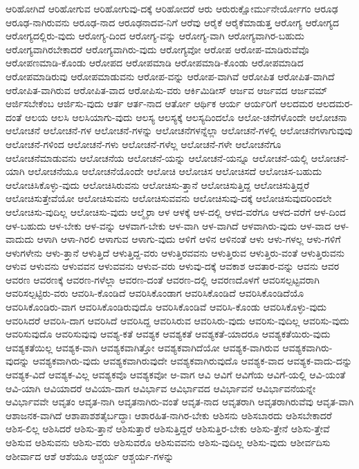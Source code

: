 {ಆರಿಹೋಗಿದೆ
ಆರಿಹೋಗುವ
ಆರಿಹೋಗುವು-ದಕ್ಕೆ
ಆರಿಹೋದರೆ
ಆರು
ಆರುರುಕ್ಷೋರ್ಮುನೇರ್ಯೋಗಂ
ಆರೂಢ
ಆರೂಢ-ನಾಗಿರುವನು
ಆರೂಢ-ನಾದ
ಆರೂಢನಾದವ-ನಿಗೆ
ಆರೆವು
ಆರೈಕೆ
ಆರೈಕೆಮಾಡುತ್ತ
ಆರೋಗ್ಯ
ಆರೋಗ್ಯದ
ಆರೋಗ್ಯದಲ್ಲಿರು-ವುದು
ಆರೋಗ್ಯ-ದಿಂದ
ಆರೋಗ್ಯ-ವನ್ನು
ಆರೋಗ್ಯ-ವಾಗಿ
ಆರೋಗ್ಯವಾಗಿರ-ಬಹುದು
ಆರೋಗ್ಯವಾಗಿರಬೇಕಾದರೆ
ಆರೋಗ್ಯವಾಗಿರು-ವುದು
ಆರೋಗ್ಯವೋ
ಆರೋಪ
ಆರೋಪ-ಮಾಡಿರುವೆವೊ
ಆರೋಪಣಮಾಡಿ-ಕೊಂಡು
ಆರೋಪದ
ಆರೋಪಮಾಡಿ
ಆರೋಪಮಾಡಿ-ಕೊಂಡು
ಆರೋಪಮಾಡಿದ
ಆರೋಪಮಾಡಿರುವು
ಆರೋಪಮಾಡುವನು
ಆರೋಪ-ವನ್ನು
ಆರೋಪ-ವಾಗಿವೆ
ಆರೋಪಿತ
ಆರೋಪಿತ-ವಾಗಿದೆ
ಆರೋಪಿತ-ವಾಗಿರುವ
ಆರೋಪಿತ-ವಾದ
ಆರೋಪಿಸು-ವರು
ಆರ್ಕಿಮಿಡೀಸ್
ಆರ್ಜವ
ಆರ್ಜವದ
ಆರ್ಜವಮ್
ಆರ್ಜಿಸಬೇಕೆಂಬ
ಆರ್ಜಿಸು-ವುದು
ಆರ್ತ
ಆರ್ತ-ನಾದ
ಆರ್ತೋ
ಆರ್ಥಿಕ
ಆರ್ಯ
ಆರ್ಯರಿಗೆ
ಆಲದಮರ
ಆಲದಮರ-ದಂತೆ
ಆಲಯ
ಆಲಸಿ
ಆಲಸಿಯಾಗು-ವುದು
ಆಲಸ್ಯ
ಆಲಸ್ಯಕ್ಕೆ
ಆಲಸ್ಯದಿಂದಲೊ
ಆಲೋ-ಚನೆಗಳೊಂದೇ
ಆಲೋಚನಾ
ಆಲೋಚನೆ
ಆಲೋಚನೆ-ಗಳ
ಆಲೋಚನೆ-ಗಳನ್ನು
ಆಲೋಚನೆಗಳನ್ನೆಲ್ಲಾ
ಆಲೋಚನೆ-ಗಳಲ್ಲಿ
ಆಲೋಚನೆಗಳಾಗುವುವು
ಆಲೋಚನೆ-ಗಳಿಂದ
ಆಲೋಚನೆ-ಗಳು
ಆಲೋಚನೆ-ಗಳೆಲ್ಲ
ಆಲೋಚನೆ-ಗಳೇ
ಆಲೋಚನೆಗೂ
ಆಲೋಚನೆಮಾಡುವನು
ಆಲೋಚನೆಯ
ಆಲೋಚನೆ-ಯನ್ನು
ಆಲೋಚನೆ-ಯನ್ನೂ
ಆಲೋಚನೆ-ಯಲ್ಲಿ
ಆಲೋಚನೆ-ಯಾಗಿ
ಆಲೋಚನೆಯೂ
ಆಲೋಚನೆಯೊಂದೇ
ಆಲೋಚಿ
ಆಲೋಚಿಸ
ಆಲೋಚಿಸದೆ
ಆಲೋಚಿಸ-ಬಹುದು
ಆಲೋಚಿಸಿಕೊಳ್ಳು-ವುದು
ಆಲೋಚಿಸಿರುವನು
ಆಲೋಚಿಸು-ತ್ತಾನೆ
ಆಲೋಚಿಸುತ್ತಿದ್ದ
ಆಲೋಚಿಸುತ್ತಿದ್ದರೆ
ಆಲೋಚಿಸುತ್ತೇವೆಯೋ
ಆಲೋಚಿಸುವನು
ಆಲೋಚಿಸುವವನು
ಆಲೋಚಿಸುವು-ದಕ್ಕೆ
ಆಲೋಚಿಸುವುದರಿಂದಲೇ
ಆಲೋಚಿಸು-ವುದಿಲ್ಲ
ಆಲೋಚಿಸು-ವುದು
ಆಲ್ಮೈರಾ
ಆಳ
ಆಳಕ್ಕೆ
ಆಳ-ದಲ್ಲಿ
ಆಳದ-ವರೆಗೂ
ಆಳದ-ವರೆಗೆ
ಆಳ-ದಿಂದ
ಆಳ-ಬಹುದು
ಆಳ-ಬೇಕು
ಆಳ-ವನ್ನು
ಆಳವಾಗ-ಬೇಕು
ಆಳ-ವಾಗಿ
ಆಳ-ವಾಗಿದೆ
ಆಳವಾಗಿರು-ವುದು
ಆಳ-ವಾದ
ಆಳ-ವಾದುದು
ಆಳಾಗಿ
ಆಳಾ-ಗಿರಲಿ
ಆಳಾಗುವ
ಆಳಾಗು-ವುದು
ಆಳಿಗೆ
ಆಳಿನ
ಆಳಿನಂತೆ
ಆಳು
ಆಳು-ಗಳಲ್ಲ
ಆಳು-ಗಳಿಗೆ
ಆಳುಗಳೇನು
ಆಳು-ತ್ತಾನೆ
ಆಳುತ್ತಿದೆ
ಆಳುತ್ತಿದ್ದ-ವರು
ಆಳುತ್ತಿರವವನು
ಆಳುತ್ತಿರುವ
ಆಳುತ್ತಿರು-ವಂತೆ
ಆಳುತ್ತಿರುವನು
ಆಳುವ
ಆಳುವನು
ಆಳುವವನ
ಆಳುವವನು
ಆಳುವ-ವರು
ಆಳುವು-ದಕ್ಕೆ
ಆವಕಾಶ
ಆವತಾರ-ವನ್ನು
ಆವನು
ಆವರ
ಆವರಣ
ಆವರಣಕ್ಕೆ
ಆವರಣ-ಗಳೆಲ್ಲಾ
ಆವರಣ-ದಂತೆ
ಆವರಣ-ದಲ್ಲಿ
ಆವರಣದೊಳಗೆ
ಆವರಿಸಲ್ಪಟ್ಟವರಾಗಿ
ಆವರಿಸಲ್ಪಟ್ಟಿರು-ವರು
ಆವರಿಸಿ-ಕೊಂಡಿದೆ
ಆವರಿಸಿಕೊಂಡಾಗ
ಆವರಿಸಿಕೊಂಡಿದೆ
ಆವರಿಸಿಕೊಂಡಿದೆಯೊ
ಆವರಿಸಿಕೊಂಡಿರು-ವಾಗ
ಆವರಿಸಿಕೊಂಡಿರುವುದೊ
ಆವರಿಸಿಕೊಂಡಿವೆ
ಆವರಿಸಿ-ಕೊಂಡು
ಆವರಿಸಿಕೊಳ್ಳು-ವುದು
ಆವರಿಸಿದರೆ
ಆವರಿಸಿ-ದಾಗ
ಆವರಿಸಿದೆ
ಆವರಿಸಿದ್ದ
ಆವರಿಸಿರುವ
ಆವರಿಸಿರು-ವುದು
ಆವರಿಸು-ವುದಿಲ್ಲ
ಆವರಿಸು-ವುದು
ಆವರಿಸುವುದೊ
ಆವರಿಸುವುವು
ಆವಶ್ಯ-ಕತೆ
ಆವಶ್ಯಕ
ಆವಶ್ಯಕತೆ
ಆವಶ್ಯಕತೆ-ಯಾದರೂ
ಆವಶ್ಯಕತೆಯಿರು-ವುದು
ಆವಶ್ಯಕತೆಯಿಲ್ಲ
ಆವಶ್ಯಕ-ವಾಗಿ
ಆವಶ್ಯಕವಾಗಿತ್ತೋ
ಆವಶ್ಯಕವಾಗಿದೆಯೋ
ಆವಶ್ಯಕ-ವಾಗಿರುವ
ಆವಶ್ಯಕವಾಗಿರು-ವುದನ್ನು
ಆವಶ್ಯಕವಾಗಿರು-ವುದು
ಆವಶ್ಯಕವಾಗಿರುವುದೇ
ಆವಶ್ಯಕವಾಗಿರುವುದೊ
ಆವಶ್ಯಕ-ವಾದ
ಆವಶ್ಯಕ-ವಾದು-ದನ್ನು
ಆವಶ್ಯಕ-ವಿದೆ
ಆವಶ್ಯಕ-ವಿಲ್ಲ
ಆವಶ್ಯಕವೊ
ಆವಶ್ಯಕವೋ
ಆ-ವಾಗ
ಆವಿ
ಆವಿಗೆ
ಆವಿಗೆಯ
ಆವಿಗೆ-ಯಲ್ಲಿ
ಆವಿ-ಯಂತೆ
ಆವಿ-ಯಾಗಿ
ಆವಿಯಾದರೆ
ಆವಿಯಾ-ದಾಗ
ಆವಿರ್ಭಾವ
ಆವಿರ್ಭಾವದ
ಆವಿರ್ಭಾವನೆ
ಆವಿರ್ಭಾವನೆಯನ್ನೇ
ಆವಿರ್ಭಾವವೇ
ಆವೃತಂ
ಆವೃತ-ನಾಗಿ
ಆವೃತನಾಗಿರು-ವಂತೆ
ಆವೃತ-ನಾದ
ಆವೃತರಾಗಿ
ಆವೃತರಾಗಿರುವೆವು
ಆವೃತ-ವಾಗಿ
ಆಶಾಜನಕ-ವಾಗಿದೆ
ಆಶಾಪಾಶಶತೈರ್ಬದ್ಧಾಃ
ಆಶಾರಹಿತ-ನಾಗಿರ-ಬೇಕು
ಆಶಿಸನು
ಆಶಿಸಬಾರದು
ಆಶಿಸಬೇಕಾದರೆ
ಆಶಿಸ-ಲಿಲ್ಲ
ಆಶಿಸಿದರೆ
ಆಶಿಸು-ತ್ತಾನೆ
ಆಶಿಸುತ್ತಾರೆ
ಆಶಿಸುತ್ತಿದ್ದರೆ
ಆಶಿಸುತ್ತಿರ-ಬೇಕು
ಆಶಿಸು-ತ್ತೇನೆ
ಆಶಿಸು-ತ್ತೇವೆ
ಆಶಿಸುವ
ಆಶಿಸುವನು
ಆಶಿಸು-ವರು
ಆಶಿಸುವರೊ
ಆಶಿಸುವವನು
ಆಶಿಸು-ವುದಿಲ್ಲ
ಆಶಿಸು-ವುದು
ಆಶೀರ್ವದಿಸು
ಆಶೀರ್ವಾದ
ಆಶೆ
ಆಶೆಯೂ
ಆಶ್ಚರ್ಯ
ಆಶ್ಚರ್ಯ-ಗಳನ್ನು
}
